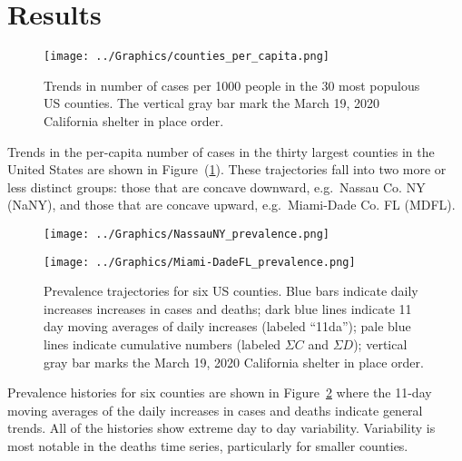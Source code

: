 \documentclass[12pt,letterpaper]{article}
\newcommand\help[1]{\color{Magenta}{\it #1 }\normalcolor}
\newcommand\EG{e.g.\ }
\begin{document}
\section*{Results}

\begin{figure}
\begin{center}
\texttt{[image: ../Graphics/counties\_per\_capita.png]}
\end{center}
\caption{\label{fig:percap}
Trends in number of cases per 1000 people in the 30 most populous US
counties.
The vertical gray bar mark the March 19, 2020 California shelter in place order.
}
\end{figure}


Trends in the per-capita number of cases in the thirty largest counties in the
United States are shown in Figure~(\ref{fig:percap}).
These trajectories fall into two more or less distinct groups: those
that are concave downward, \EG Nassau Co. NY (NaNY), and those that are
concave upward, \EG Miami-Dade Co. FL (MDFL).


\begin{figure}
{\scriptsize
\begin{center}
\texttt{[image: ../Graphics/NassauNY\_prevalence.png]}
 
\vspace{0.25truein}

\texttt{[image: ../Graphics/Miami-DadeFL\_prevalence.png]}
\end{center}
}
\caption{\label{fig:prev}
Prevalence trajectories for six US counties.
Blue bars indicate daily increases increases in cases and deaths;
dark blue lines indicate 11 day moving averages of daily increases
(labeled ``11da''); 
pale blue lines indicate cumulative numbers (labeled $\Sigma C$ and
$\Sigma D$); 
vertical gray bar marks the March 19, 2020 California shelter in place order.
\help{remove annotations.}
}
\end{figure}

Prevalence histories for six counties are shown in
Figure~\ref{fig:prev} where the 11-day moving averages of the daily
increases in cases and deaths indicate general trends.
All of the histories show extreme day to day variability.
Variability is most notable in the deaths
time series, particularly for smaller counties.
\end{document}
